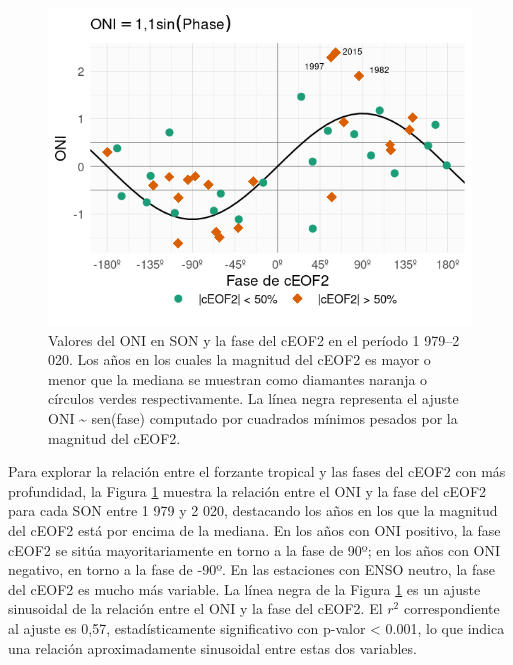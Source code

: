 \documentclass[12pt,oneside,a4paper]{reedthesis}
\begin{document}
\begin{figure}

{\centering \includegraphics{figures/20-ceofs/enso-phase-1} 

}

\caption{Valores del ONI en SON y la fase del cEOF2 en el período 1 979--2 020. Los años en los cuales la magnitud del cEOF2 es mayor o menor que la mediana se muestran como diamantes naranja o círculos verdes respectivamente. La línea negra representa el ajuste ONI \textasciitilde{} sen(fase) computado por cuadrados mínimos pesados por la magnitud del cEOF2.}\label{fig:enso-phase}
\end{figure}

Para explorar la relación entre el forzante tropical y las fases del cEOF2 con más profundidad, la Figura \ref{fig:enso-phase} muestra la relación entre el ONI y la fase del cEOF2 para cada SON entre 1 979 y 2 020, destacando los años en los que la magnitud del cEOF2 está por encima de la mediana.
En los años con ONI positivo, la fase cEOF2 se sitúa mayoritariamente en torno a la fase de 90º; en los años con ONI negativo, en torno a la fase de -90º.
En las estaciones con ENSO neutro, la fase del cEOF2 es mucho más variable.
La línea negra de la Figura \ref{fig:enso-phase} es un ajuste sinusoidal de la relación entre el ONI y la fase del cEOF2.
El \(r^2\) correspondiente al ajuste es 0,57, estadísticamente significativo con p-valor \textless{} 0.001, lo que indica una relación aproximadamente sinusoidal entre estas dos variables.
\end{document}
